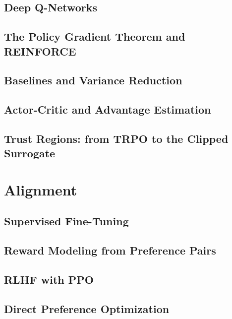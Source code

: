 \subsection{Deep Q-Networks}

\subsection{The Policy Gradient Theorem and REINFORCE}

\subsection{Baselines and Variance Reduction}

\subsection{Actor-Critic and Advantage Estimation}

\subsection{Trust Regions: from TRPO to the Clipped Surrogate}

\section{Alignment}
\label{sec:alignment}

\subsection{Supervised Fine-Tuning}

\subsection{Reward Modeling from Preference Pairs}

\subsection{RLHF with PPO}


\subsection{Direct Preference Optimization}

